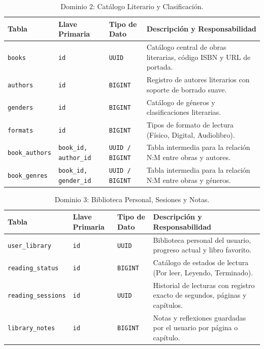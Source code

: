 \documentclass[12pt, atypical, journal]{article}
\begin{document}
\begin{table}[H]
\centering
\footnotesize
\begin{tabular}{|p{3.5cm}|p{2.3cm}|p{2cm}|p{5.5cm}|}
\hline
\textbf{Tabla} & \textbf{Llave Primaria} & \textbf{Tipo de Dato} & \textbf{Descripción y Responsabilidad} \\ \hline
\texttt{books} & \texttt{id} & \texttt{UUID} & Catálogo central de obras literarias, código ISBN y URL de portada. \\ \hline
\texttt{authors} & \texttt{id} & \texttt{BIGINT} & Registro de autores literarios con soporte de borrado suave. \\ \hline
\texttt{genders} & \texttt{id} & \texttt{BIGINT} & Catálogo de géneros y clasificaciones literarias. \\ \hline
\texttt{formats} & \texttt{id} & \texttt{BIGINT} & Tipos de formato de lectura (Físico, Digital, Audiolibro). \\ \hline
\texttt{book\_authors} & \texttt{book\_id, author\_id} & \texttt{UUID / BIGINT} & Tabla intermedia para la relación N:M entre obras y autores. \\ \hline
\texttt{book\_genres} & \texttt{book\_id, gender\_id} & \texttt{UUID / BIGINT} & Tabla intermedia para la relación N:M entre obras y géneros. \\ \hline
\end{tabular}
\caption{Dominio 2: Catálogo Literario y Clasificación.}
\label{tab:db_books}
\end{table}

\begin{table}[H]
\centering
\footnotesize
\begin{tabular}{|p{3.5cm}|p{2.3cm}|p{2cm}|p{5.5cm}|}
\hline
\textbf{Tabla} & \textbf{Llave Primaria} & \textbf{Tipo de Dato} & \textbf{Descripción y Responsabilidad} \\ \hline
\texttt{user\_library} & \texttt{id} & \texttt{UUID} & Biblioteca personal del usuario, progreso actual y libro favorito. \\ \hline
\texttt{reading\_status} & \texttt{id} & \texttt{BIGINT} & Catálogo de estados de lectura (Por leer, Leyendo, Terminado). \\ \hline
\texttt{reading\_sessions}& \texttt{id} & \texttt{UUID} & Historial de lecturas con registro exacto de segundos, páginas y capítulos. \\ \hline
\texttt{library\_notes} & \texttt{id} & \texttt{BIGINT} & Notas y reflexiones guardadas por el usuario por página o capítulo. \\ \hline
\end{tabular}
\caption{Dominio 3: Biblioteca Personal, Sesiones y Notas.}
\label{tab:db_library}
\end{table}
\end{document}
